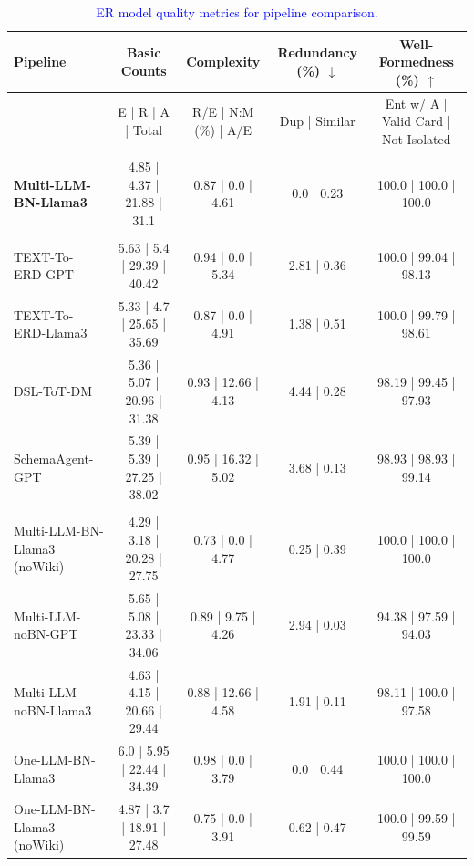 \begin{table}[t]
\centering
\caption{\textcolor{blue}{ER model quality metrics for pipeline comparison.}}
\label{tab:structural_metrics_pipelines}
\scriptsize
\setlength{\tabcolsep}{2.5pt}
\begin{tabular}{lcccc}
\toprule
\textbf{Pipeline}
& \textbf{Basic Counts}
& \textbf{Complexity}
& \textbf{Redundancy (\%)} $\downarrow$
& \textbf{Well-Formedness (\%)} $\uparrow$ \\
\midrule
& E | R | A | Total
& R/E | N:M (\%) | A/E
& Dup | Similar
& Ent w/ A | Valid Card | Not Isolated \\
\rowcolor{gray!15}
\multicolumn{5}{@{}l}{\textit{Our Approach}} \\
\textbf{Multi-LLM-BN-Llama3} & 4.85 | 4.37 | 21.88 | 31.1 & 0.87 | 0.0 | 4.61 & 0.0 | 0.23 & 100.0 | 100.0 | 100.0 \\
\midrule
\rowcolor{gray!15}
\multicolumn{5}{@{}l}{\textit{Baselines}} \\
TEXT-To-ERD-GPT & 5.63 | 5.4 | 29.39 | 40.42 & 0.94 | 0.0 | 5.34 & 2.81 | 0.36 & 100.0 | 99.04 | 98.13 \\
TEXT-To-ERD-Llama3 & 5.33 | 4.7 | 25.65 | 35.69 & 0.87 | 0.0 | 4.91 & 1.38 | 0.51 & 100.0 | 99.79 | 98.61 \\
DSL-ToT-DM & 5.36 | 5.07 | 20.96 | 31.38 & 0.93 | 12.66 | 4.13 & 4.44 | 0.28 & 98.19 | 99.45 | 97.93 \\
SchemaAgent-GPT & 5.39 | 5.39 | 27.25 | 38.02 & 0.95 | 16.32 | 5.02 & 3.68 | 0.13 & 98.93 | 98.93 | 99.14 \\
\midrule
\rowcolor{gray!15}
\multicolumn{5}{@{}l}{\textit{Variants}} \\
Multi-LLM-BN-Llama3 (noWiki) & 4.29 | 3.18 | 20.28 | 27.75 & 0.73 | 0.0 | 4.77 & 0.25 | 0.39 & 100.0 | 100.0 | 100.0 \\
Multi-LLM-noBN-GPT & 5.65 | 5.08 | 23.33 | 34.06 & 0.89 | 9.75 | 4.26 & 2.94 | 0.03 & 94.38 | 97.59 | 94.03 \\
Multi-LLM-noBN-Llama3 & 4.63 | 4.15 | 20.66 | 29.44 & 0.88 | 12.66 | 4.58 & 1.91 | 0.11 & 98.11 | 100.0 | 97.58 \\
One-LLM-BN-Llama3 & 6.0 | 5.95 | 22.44 | 34.39 & 0.98 | 0.0 | 3.79 & 0.0 | 0.44 & 100.0 | 100.0 | 100.0 \\
One-LLM-BN-Llama3 (noWiki) & 4.87 | 3.7 | 18.91 | 27.48 & 0.75 | 0.0 | 3.91 & 0.62 | 0.47 & 100.0 | 99.59 | 99.59 \\
\bottomrule
\end{tabular}
\end{table}
